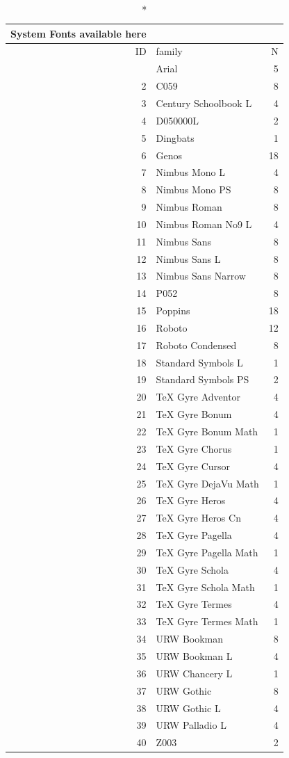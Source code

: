 \documentclass[
  12pt,
  letterpaper,
  DIV=11,
  numbers=noendperiod]{scrartcl}
\begin{document}
\begin{longtable*}{rlr}
\caption*{
{\large System Fonts available here}
} \\ 
\toprule
ID & family & N \\ 
\midrule{} & Arial & 5 \\ 
2 & C059 & 8 \\ 
3 & Century Schoolbook L & 4 \\ 
4 & D050000L & 2 \\ 
5 & Dingbats & 1 \\ 
6 & Genos & 18 \\ 
7 & Nimbus Mono L & 4 \\ 
8 & Nimbus Mono PS & 8 \\ 
9 & Nimbus Roman & 8 \\ 
10 & Nimbus Roman No9 L & 4 \\ 
11 & Nimbus Sans & 8 \\ 
12 & Nimbus Sans L & 8 \\ 
13 & Nimbus Sans Narrow & 8 \\ 
14 & P052 & 8 \\ 
15 & Poppins & 18 \\ 
16 & Roboto & 12 \\ 
17 & Roboto Condensed & 8 \\ 
18 & Standard Symbols L & 1 \\ 
19 & Standard Symbols PS & 2 \\ 
20 & TeX Gyre Adventor & 4 \\ 
21 & TeX Gyre Bonum & 4 \\ 
22 & TeX Gyre Bonum Math & 1 \\ 
23 & TeX Gyre Chorus & 1 \\ 
24 & TeX Gyre Cursor & 4 \\ 
25 & TeX Gyre DejaVu Math & 1 \\ 
26 & TeX Gyre Heros & 4 \\ 
27 & TeX Gyre Heros Cn & 4 \\ 
28 & TeX Gyre Pagella & 4 \\ 
29 & TeX Gyre Pagella Math & 1 \\ 
30 & TeX Gyre Schola & 4 \\ 
31 & TeX Gyre Schola Math & 1 \\ 
32 & TeX Gyre Termes & 4 \\ 
33 & TeX Gyre Termes Math & 1 \\ 
34 & URW Bookman & 8 \\ 
35 & URW Bookman L & 4 \\ 
36 & URW Chancery L & 1 \\ 
37 & URW Gothic & 8 \\ 
38 & URW Gothic L & 4 \\ 
39 & URW Palladio L & 4 \\ 
40 & Z003 & 2 \\ 
\bottomrule
\end{longtable*}
\end{document}
